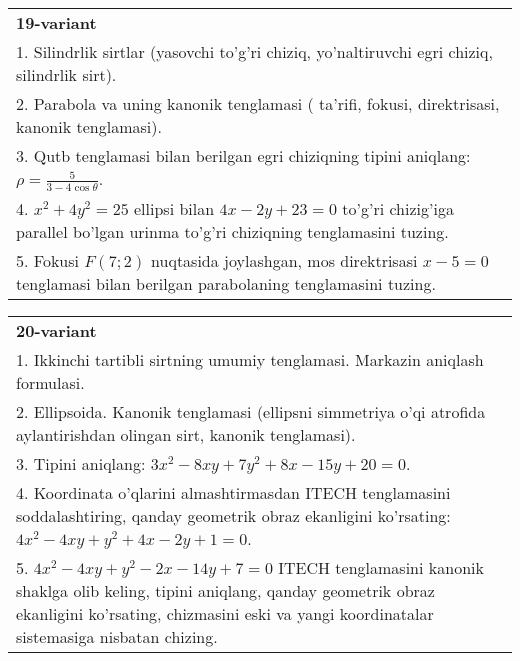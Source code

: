 \documentclass{article}
\begin{document}
\begin{tabular}{m{17cm}}
\textbf{19-variant}\\
1. Silindrlik sirtlar (yasovchi to'g'ri chiziq, yo'naltiruvchi egri chiziq, silindrlik sirt).\\

2. Parabola va uning kanonik tenglamasi ( ta'rifi, fokusi, direktrisasi, kanonik tenglamasi).\\

3. Qutb tenglamasi bilan berilgan egri chiziqning tipini aniqlang: $\rho=\frac{5}{3-4\cos\theta}$.\\

4. $x^{2} + 4y^{2} = 25$ ellipsi bilan $4x - 2y + 23 = 0$ to'g'ri chizig'iga parallel bo'lgan urinma to'g'ri chiziqning tenglamasini tuzing.  \\

5. Fokusi $F(7;2)$ nuqtasida joylashgan, mos direktrisasi $x - 5 = 0$ tenglamasi bilan berilgan parabolaning tenglamasini tuzing.  
\end{tabular}
\vspace{1cm}


\begin{tabular}{m{17cm}}
\textbf{20-variant}\\
1. Ikkinchi tartibli sirtning umumiy tenglamasi. Markazin aniqlash formulasi.\\

2. Ellipsoida. Kanonik tenglamasi (ellipsni simmetriya o'qi atrofida aylantirishdan olingan sirt, kanonik tenglamasi).\\

3. Tipini aniqlang: $3x^{2}-8xy+7y^{2}+8x-15y+20=0$.\\

4. Koordinata o'qlarini almashtirmasdan ITECH tenglamasini soddalashtiring, qanday geometrik obraz ekanligini ko'rsating: $4x^{2} - 4xy + y^{2} + 4x - 2y + 1 = 0$.  \\

5. $4x^{2} - 4xy + y^{2} - 2x - 14y + 7 = 0$ ITECH tenglamasini kanonik shaklga olib keling, tipini aniqlang, qanday geometrik obraz ekanligini ko'rsating, chizmasini eski va yangi koordinatalar sistemasiga nisbatan chizing.  
\end{tabular}
\vspace{1cm}
\end{document}
